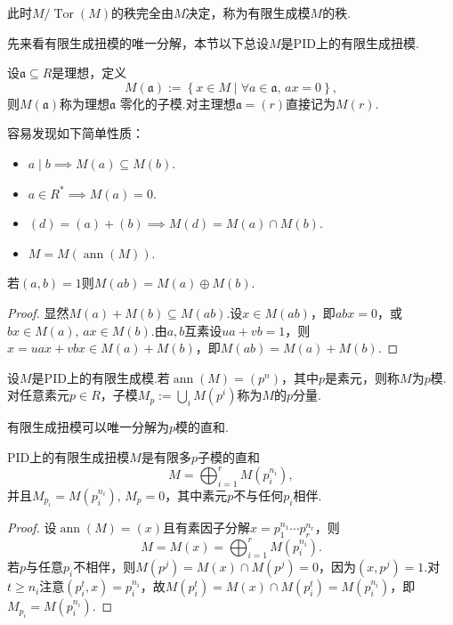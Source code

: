 此时$M/\operatorname*{Tor}(M)$的秩完全由$M$决定，称为有限生成模$M$的{\heiti 秩}.

先来看有限生成扭模的唯一分解，{\heiti 本节以下总设$M$是PID上的有限生成扭模}.

设$\mathfrak{a}\subseteq R$是理想，定义
\[
    M(\mathfrak{a}):=\left\{x\in M\mid \forall a\in\mathfrak{a},\,ax=0\right\},
\]
则$M(\mathfrak{a})$称为理想$\mathfrak{a}$ {\heiti 零化的子模}.对主理想$\mathfrak{a}=(r)$直接记为$M(r)$.

容易发现如下简单性质：
\begin{itemize}
    \item $a\mid b\implies M(a)\subseteq M(b)$.
    \item $a\in R^*\implies M(a)=0$.
    \item $(d)=(a)+(b)\implies M(d)=M(a)\cap M(b)$.
    \item $M=M(\operatorname*{ann}(M))$.
\end{itemize}

\begin{lemma*}
    若$(a,b)=1$则$M(ab)=M(a)\oplus M(b)$.
\end{lemma*}
\begin{proof}
    显然$M(a)+M(b)\subseteq M(ab)$.设$x\in M(ab)$，即$abx=0$，或$bx\in M(a),\,ax\in M(b)$.由$a,b$互素设$ua+vb=1$，则$x=uax+vbx\in M(a)+M(b)$，即$M(ab)=M(a)+M(b)$.
\end{proof}

\begin{definition}
    设$M$是PID上的有限生成模.若$\operatorname*{ann}(M)=(p^n)$，其中$p$是素元，则称$M$为{\heiti $p$模}.对任意素元$p\in R$，子模$M_p:=\bigcup_i M(p^i)$称为$M$的{\heiti $p$分量}.
\end{definition}

有限生成扭模可以唯一分解为$p$模的直和.
\begin{thm}
    PID上的有限生成扭模$M$是有限多$p$子模的直和
    \[
        M=\bigoplus_{i=1}^rM(p_i^{n_i}),
    \]
    并且$M_{p_i}=M(p_i^{n_i}),\,M_p=0$\footnotemark，其中素元$p$不与任何$p_i$相伴.
\end{thm}
\begin{proof}
    设$\operatorname*{ann}(M)=(x)$且有素因子分解$x=p_1^{n_1}\cdots p_r^{n_r}$，则
    \[
        M=M(x)=\bigoplus_{i=1}^rM(p_i^{n_i}).
    \]
    若$p$与任意$p_i$不相伴，则$M(p^j)=M(x)\cap M(p^j)=0$，因为$(x,p^j)=1$.对$t\ge n_i$注意$(p_i^t,x)=p_i^{n_i}$，故$M(p_i^t)=M(x)\cap M(p_i^t)=M(p_i^{n_i})$，即$M_{p_i}=M(p_i^{n_i})$.
\end{proof}

